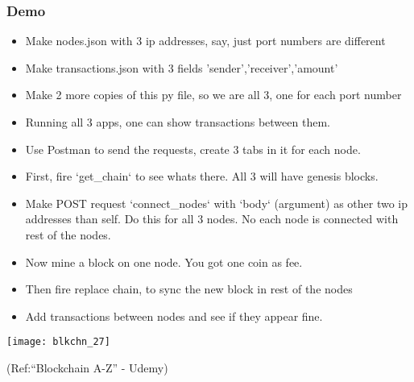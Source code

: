 \begin{frame}[fragile]\frametitle{Demo}
\begin{itemize}
\item Make nodes.json with 3 ip addresses, say, just port numbers are different
\item Make transactions.json with 3 fields 'sender','receiver','amount'
\item Make 2 more copies of this py file, so we are all 3, one for each port number
\item Running all 3 apps, one can show transactions between them.
\item Use Postman to send the requests, create 3 tabs in it for each node.
\item First, fire `get\_chain` to see whats there. All 3 will have genesis blocks.
\item Make POST request `connect\_nodes` with `body` (argument) as other two ip addresses than self. Do this for all 3 nodes. No each node is connected with rest of the nodes.
\item Now mine a block on one node. You got one coin as fee.
\item Then fire replace chain, to sync the new block in rest of the nodes
\item Add transactions between nodes and see if they appear fine.
\end{itemize}

\begin{center}
\texttt{[image: blkchn\_27]}

{\tiny (Ref:``Blockchain A-Z'' - Udemy)}
\end{center}

\end{frame}


